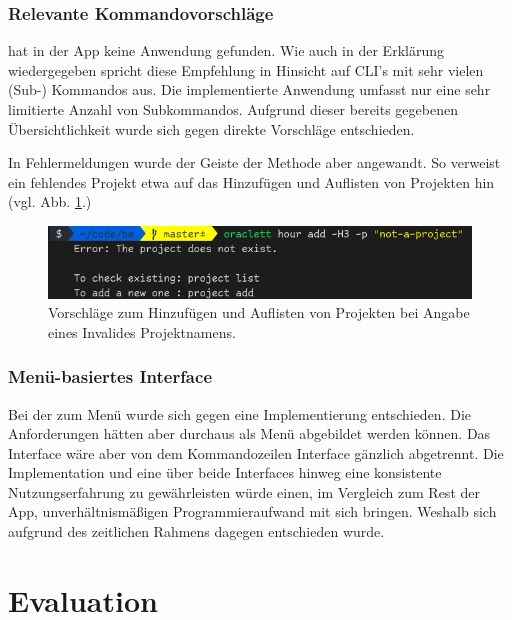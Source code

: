 \documentclass[oneside,bibliography=totocnumbered,BCOR=5mm]{scrbook}
\begin{document}
\subsection{Relevante Kommandovorschläge}

 hat in der App keine Anwendung gefunden. Wie
auch in der Erklärung wiedergegeben spricht \cite{dutta} diese Empfehlung in
Hinsicht auf CLI's mit sehr vielen (Sub-) Kommandos aus. Die implementierte
Anwendung umfasst nur eine sehr limitierte Anzahl von Subkommandos. Aufgrund
dieser bereits gegebenen Übersichtlichkeit wurde sich gegen direkte Vorschläge
entschieden.

\medskip

In Fehlermeldungen wurde der Geiste der Methode aber angewandt. So verweist ein fehlendes Projekt etwa auf das Hinzufügen und Auflisten von Projekten hin (vgl. Abb. \ref{fig:recommendation-invalid-project}.)

\begin{figure}
  \centering
  \includegraphics[scale=0.5]{recommendation-invalid-project.png}
  \caption{Vorschläge zum Hinzufügen und Auflisten von Projekten bei Angabe eines Invalides Projektnamens.}
  \label{fig:recommendation-invalid-project}
\end{figure}

\subsection{Menü-basiertes Interface}

Bei der  zum Menü wurde sich gegen eine Implementierung
entschieden. Die Anforderungen hätten aber durchaus als Menü abgebildet werden
können. Das Interface wäre aber von dem Kommandozeilen Interface gänzlich
abgetrennt. Die Implementation und eine über beide Interfaces hinweg eine
konsistente Nutzungserfahrung zu gewährleisten würde einen, im Vergleich zum
Rest der App, unverhältnismäßigen Programmieraufwand mit sich bringen. Weshalb
sich aufgrund des zeitlichen Rahmens dagegen entschieden wurde.

\chapter{Evaluation}
\end{document}
